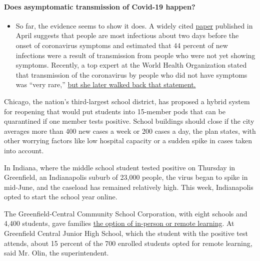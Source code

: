 \begin{itemize}
{  \paragraph{Does asymptomatic transmission of Covid-19
  happen?}\label{does-asymptomatic-transmission-of-covid-19-happen}}

  \begin{itemize}
  \tightlist
  \item
    So far, the evidence seems to show it does. A widely cited
    \href{https://www.nature.com/articles/s41591-020-0869-5}{paper}
    published in April suggests that people are most infectious about
    two days before the onset of coronavirus symptoms and estimated that
    44 percent of new infections were a result of transmission from
    people who were not yet showing symptoms. Recently, a top expert at
    the World Health Organization stated that transmission of the
    coronavirus by people who did not have symptoms was ``very rare,''
    \href{https://www.nytimes3xbfgragh.onion/2020/06/09/world/coronavirus-updates.html?action=click\&pgtype=Article\&state=default\&region=MAIN_CONTENT_3\&context=storylines_faq\#link-1f302e21}{but
    she later walked back that statement.}
  \end{itemize}
\end{itemize}

Chicago, the nation's third-largest school district, has proposed a
hybrid system for reopening that would put students into 15-member pods
that can be quarantined if one member tests positive. School buildings
should close if the city averages more than 400 new cases a week or 200
cases a day, the plan states, with other worrying factors like low
hospital capacity or a sudden spike in cases taken into account.

In Indiana, where the middle school student tested positive on Thursday
in Greenfield, an Indianapolis suburb of 23,000 people, the virus began
to spike in mid-June, and the caseload has remained relatively high.
This week, Indianapolis opted to start the school year online.

The Greenfield-Central Community School Corporation, with eight schools
and 4,400 students, gave families
\href{https://www.gcsc.k12.in.us/wp-content/uploads/2020/07/Greenfield-Central-School-Opening-Procedures-Final-7-8-2020.pdf}{the
option of in-person or remote learning}. At Greenfield Central Junior
High School, which the student with the positive test attends, about 15
percent of the 700 enrolled students opted for remote learning, said Mr.
Olin, the superintendent.

